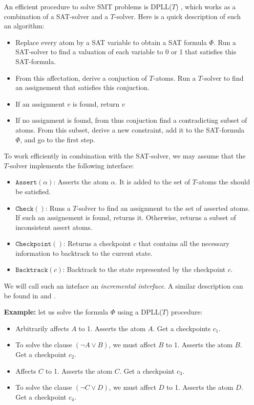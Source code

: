 \documentclass{article}
\newcommand{\iassert}[1]{\mathtt{Assert}(#1)}
\newcommand{\icheck}{\mathtt{Check}()}
\newcommand{\icheckpoint}{\mathtt{Checkpoint}()}
\newcommand{\ibacktrack}[1]{\mathtt{Backtrack}(#1)}
\begin{document}
An efficient procedure to solve SMT problems is DPLL($T$) \cite{Decision2016},
which works as a combination of a SAT-solver and a $T$-solver. Here is a quick
description of such an algorithm:
\begin{itemize}
  \item Replace every atom by a SAT variable to obtain a SAT formula $\Phi$.
    Run a SAT-solver to find a valuation of each variable to 0 or 1 that
    satisfies this SAT-formula.
  \item From this affectation, derive a conjuction of $T$-atoms. Run a
    $T$-solver to find an assignement that satisfies this conjuction.
  \item If an assignment $v$ is found, return $v$
  \item If no assignment is found, from thus conjuction find a contradicting
    subset of atoms. From this subset, derive a new constraint, add it to the
    SAT-formula $\Phi$, and go to the first step.
\end{itemize}

To work efficiently in combination with the SAT-solver, we may assume that the
$T$-solver implements the following interface:
\begin{itemize}
  \item $\iassert{\alpha}$: Asserts the atom $\alpha$. It is added to the set of
    $T$-atoms the should be satisfied.
  \item $\icheck$: Runs a $T$-solver to find an assignment to the set of
    asserted atoms. If such an assignement is found, returns it. Otherwise,
    returns a subset of inconsistent assert atoms.
  \item $\icheckpoint$: Returns a checkpoint $c$ that contains all the necessary
    information to backtrack to the current state.
  \item $\ibacktrack{c}$: Backtrack to the state represented by the checkpoint
    $c$.
\end{itemize}

We will call such an inteface an \textit{incremental interface}.
A similar description can be found in \cite{Dutertre2006} and
\cite{Thiemann2018}.

\textbf{Example:} let us solve the formula $\Phi$ using a DPLL($T$) procedure:
\begin{itemize}
  \item Arbitrarily affects $A$ to 1. Asserts the atom $A$. Get a checkpoints
    $c_1$.
  \item To solve the clause $(\neg A \vee B)$, we must affect $B$ to 1.
    Asserts the atom $B$. Get a checkpoint $c_2$.
  \item Affects $C$ to 1. Asserts the atom $C$. Get a checkpoint $c_3$.
  \item To solve the clause $(\neg C \vee D)$, we must affect $D$ to 1.
    Asserts the atom $D$. Get a checkpoint $c_4$.
\end{itemize}
\end{document}
